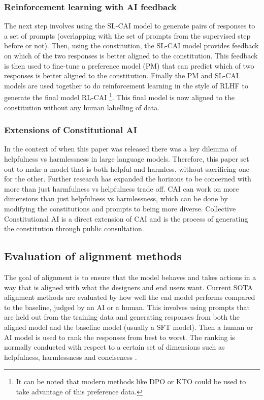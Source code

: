 \subsubsection{Reinforcement learning with AI feedback}
The next step involves using the SL-CAI model to generate pairs of responses to a set of prompts (overlapping with the set of prompts from the supervised step before or not). Then, using the constitution, the SL-CAI model provides feedback on which of the two responses is better aligned to the constitution. This feedback is then used to fine-tune a preference model (PM) that can predict which of two responses is better aligned to the constitution. Finally the PM and SL-CAI models are used together to do reinforcement learning in the style of RLHF \cite{ouyangTrainingLanguageModels2022} to generate the final model RL-CAI \footnote{It can be noted that modern methods like DPO or KTO could be used to take advantage of this preference data.}. This final model is now aligned to the constitution without any human labelling of data.

\subsubsection{Extensions of Constitutional AI}

In the context of when this paper was released there was a key dilemma of helpfulness vs harmlessness in large language models. Therefore, this paper set out to make a model that is both helpful and harmless, without sacrificing one for the other. Further research has expanded the horizons to be concerned with more than just harmfulness vs helpfulness trade off. CAI can work on more dimensions than just helpfulness vs harmlessness, which can be done by modifying the constitutions and prompts to being more diverse. Collective Constitutional AI \cite{huangCollectiveConstitutionalAI2024} is a direct extension of CAI and is the process of generating the constitution through public consultation.


\subsection{Evaluation of alignment methods}
\label{sub:eval_alignment}

The goal of alignment is to ensure that the model behaves and takes actions in a way that is aligned with what the designers and end users want. Current SOTA alignment methods are evaluated by how well the end model performs compared to the baseline, judged by an AI or a human. This involves using prompts that are held out from the training data and generating responses from both the aligned model and the baseline model (usually a SFT model). Then a human or AI model is used to rank the responses from best to worst. The ranking is normally conducted with respect to a certain set of dimensions such as helpfulness, harmlessness and conciseness \cite{janiakRethinkingEvaluationAlignment2025,alpaca_eval,zhengJudgingLLMasaJudgeMTBench2023}.

